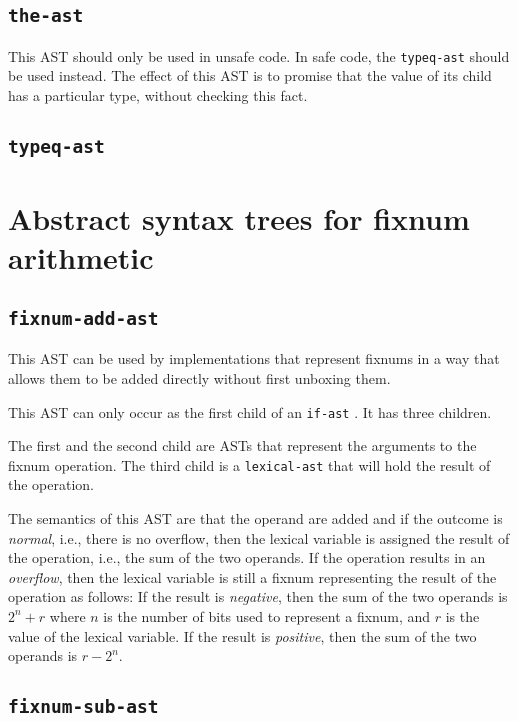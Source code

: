 \subsection{\texttt{the-ast}}
\label{the-ast}

This AST should only be used in unsafe code.  In safe code, the
\texttt{typeq-ast}  should be used instead.  The
effect of this AST is to promise that the value of its child has a
particular type, without checking this fact. 

\subsection{\texttt{typeq-ast}}
\label{typeq-ast}

\section{Abstract syntax trees for fixnum arithmetic}

\subsection{\texttt{fixnum-add-ast}}
\label{fixnum-add-ast}

This AST can be used by implementations that represent fixnums in a
way that allows them to be added directly without first unboxing
them.  

This AST can only occur as the first child of an \texttt{if-ast}
.  It has three children.

The first and the second child are ASTs that represent the arguments
to the fixnum operation.  The third child is a
\texttt{lexical-ast} that will hold the result of the operation.

The semantics of this AST are that the operand are added and if the
outcome is \emph{normal}, i.e., there is no overflow, then the lexical
variable is assigned the result of the operation, i.e., the sum of the
two operands.  If the operation results in an \emph{overflow}, then
the lexical variable is still a fixnum representing the result of the
operation as follows:  If the result is \emph{negative}, then the
sum of the two operands is $2^n + r$ where $n$ is the number of bits
used to represent a fixnum, and $r$ is the value of the lexical
variable.  If the result is \emph{positive}, then the sum of the two
operands is $r - 2^n$.

\subsection{\texttt{fixnum-sub-ast}}
\label{fixnum-sub-ast}

